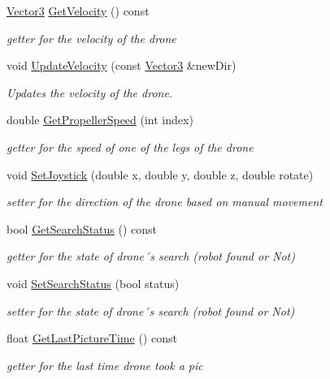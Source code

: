 \begin{DoxyCompactItemize}
\hyperlink{classVector3}{Vector3} \hyperlink{classDrone_ac5adae4a3cbe2e39f577fa7da14407c7}{Get\+Velocity} () const
\begin{DoxyCompactList}\small\item\em getter for the velocity of the drone \end{DoxyCompactList}\item 
void \hyperlink{classDrone_a8ecc9a70f1d3907a79be433bfa9b5d68}{Update\+Velocity} (const \hyperlink{classVector3}{Vector3} \&new\+Dir)
\begin{DoxyCompactList}\small\item\em Updates the velocity of the drone. \end{DoxyCompactList}\item 
double \hyperlink{classDrone_a7b2fd7d3ed57cec48ebdcd09f97b83f7}{Get\+Propeller\+Speed} (int index)
\begin{DoxyCompactList}\small\item\em getter for the speed of one of the legs of the drone \end{DoxyCompactList}\item 
void \hyperlink{classDrone_a648ebd16d398c677918d94471010ddc6}{Set\+Joystick} (double x, double y, double z, double rotate)
\begin{DoxyCompactList}\small\item\em setter for the direction of the drone based on manual movement \end{DoxyCompactList}\item 
bool \hyperlink{classDrone_a9bfe1ce0aea1215da3072434ed8e8527}{Get\+Search\+Status} () const
\begin{DoxyCompactList}\small\item\em getter for the state of drone´s search (robot found or Not) \end{DoxyCompactList}\item 
void \hyperlink{classDrone_a5349ad4b562b038a2d27ede3ed3fa80d}{Set\+Search\+Status} (bool status)
\begin{DoxyCompactList}\small\item\em setter for the state of drone´s search (robot found or Not) \end{DoxyCompactList}\item 
float \hyperlink{classDrone_a78de3dcbc6ae754e8874a8b65e8cd9ee}{Get\+Last\+Picture\+Time} () const
\begin{DoxyCompactList}\small\item\em getter for the last time drone took a pic \end{DoxyCompactList}\item 

\end{DoxyCompactItemize}
